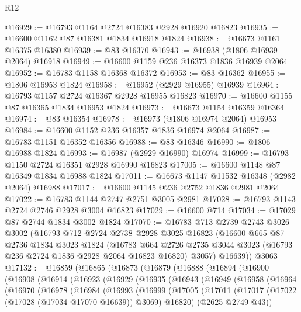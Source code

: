 \begin{lexlean}{R12}
\begin{coremodule}
@16929 := @16793 @1164 @2724 @16383 @2928 @16920 @16823
@16935 := @16600 @1162 @87 @16381 @1834 @16918 @1824
@16938 := @16673 @1161 @16375 @16380
@16939 := @83 @16370
@16943 := @16938 (@1806 @16939 @2064) @16918
@16949 := @16600 @1159 @236 @16373 @1836 @16939 @2064
@16952 := @16783 @1158 @16368 @16372
@16953 := @83 @16362
@16955 := @1806 @16953 @1824
@16958 := @16952 (@2929 @16955) @16939
@16964 := @16793 @1157 @2724 @16367 @2928 @16955 @16823
@16970 := @16600 @1155 @87 @16365 @1834 @16953 @1824
@16973 := @16673 @1154 @16359 @16364
@16974 := @83 @16354
@16978 := @16973 (@1806 @16974 @2064) @16953
@16984 := @16600 @1152 @236 @16357 @1836 @16974 @2064
@16987 := @16783 @1151 @16352 @16356
@16988 := @83 @16346
@16990 := @1806 @16988 @1824
@16993 := @16987 (@2929 @16990) @16974
@16999 := @16793 @1150 @2724 @16351 @2928 @16990 @16823
@17005 := @16600 @1148 @87 @16349 @1834 @16988 @1824
@17011 := @16673 @1147 @11532 @16348 (@2982 @2064) @16988
@17017 := @16600 @1145 @236 @2752 @1836 @2981 @2064
@17022 := @16783 @1144 @2747 @2751 @3005 @2981
@17028 := @16793 @1143 @2724 @2746 @2928 @3004 @16823
@17029 := @16600 @714
@17034 := @17029 @87 @2744 @1834 @3002 @1824
@17070 := @16783
    @713
    @2739
    @2743
    @3026
    @3002
    (@16793
      @712
      @2724
      @2738
      @2928
      @3025
      @16823
      (@16600
        @665
        @87
        @2736
        @1834
        @3023
        @1824
        (@16783
          @664
          @2726
          @2735
          @3044
          @3023
          (@16793 @236 @2724 @1836 @2928 @2064 @16823 @16820)
          @3057)
        @16639))
    @3063
@17132 := @16859
    (@16865
      (@16873
        (@16879
          (@16888
            (@16894
              (@16900
                (@16908
                  (@16914
                    (@16923
                      (@16929
                        (@16935
                          (@16943
                            (@16949
                              (@16958
                                (@16964
                                  (@16970
                                    (@16978
                                      (@16984
                                        (@16993
                                          (@16999
                                            (@17005
                                              (@17011
                                                (@17017
                                                  (@17022 (@17028 (@17034 @17070 @16639)) @3069)
                                                  @16820)
                                                (@2625 @2749 @43))

\end{coremodule}
\end{lexlean}
